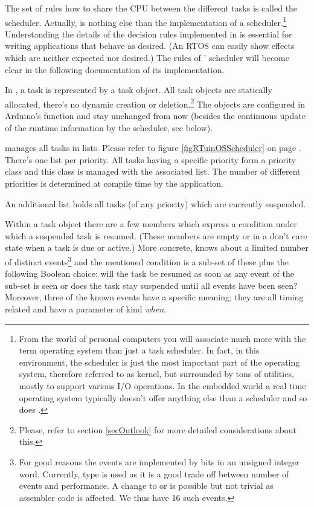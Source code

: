The set of rules how to share the CPU between the different tasks is
called the scheduler. Actually, \rtos{} is nothing else than the
implementation of a scheduler.\footnote{From the world of personal
computers you will associate much more with the term operating system than
just a task scheduler. In fact, in this environment, the scheduler is just
the most important part of the operating system, therefore referred to as
kernel, but surrounded by tons of utilities, mostly to support various I/O
operations. In the embedded world a real time operating system typically
doesn't offer anything else than a scheduler and so does \rtos{}.}
Understanding the details of the decision rules implemented in \rtos{} is
essential for writing applications that behave as desired. (An RTOS can
easily show effects which are neither expected nor desired.) The rules of
\rtos' scheduler will become clear in the following documentation of its
implementation.

In \rtos{}, a task is represented by a task object. All task objects are
statically allocated, there's no dynamic creation or
deletion.\footnote{Please, refer to section \ref{secOutlook} for more
detailed considerations about this.} The objects are configured in
Arduino's function  and stay unchanged from now (besides the
continuous update of the runtime information by the scheduler, see below).

\rtos{} manages all tasks in lists. Please refer to figure \ref{figRTuinOSScheduler} on page
\pageref{figRTuinOSScheduler}. There's one list per priority. All
tasks having a specific priority form a priority class and this class is
managed with the associated list. The number of different priorities is
determined at compile time by the application.

An additional list holds all tasks (of any priority) which are currently
suspended.

Within a task object there are a few members which express a condition
under which a suspended task is resumed. (These members are empty or in a
don't care state when a task is due or active.) More concrete, \rtos{}
knows about a limited number of distinct events\footnote{For good reasons
the events are implemented by bits in an unsigned integer word. Currently,
type  is used as it is a good trade off between number
of events and performance. A change to  or
 is possible but not trivial as assembler code is
affected. We thus have 16 such events.} and the mentioned condition is a
sub-set of these plus the following Boolean choice: will the task be
resumed as soon as any event of the sub-set is seen or does the task stay
suspended until all events have been seen? Moreover, three of the known
events have a specific meaning; they are all timing related and have a
parameter of kind \emph{when}.

